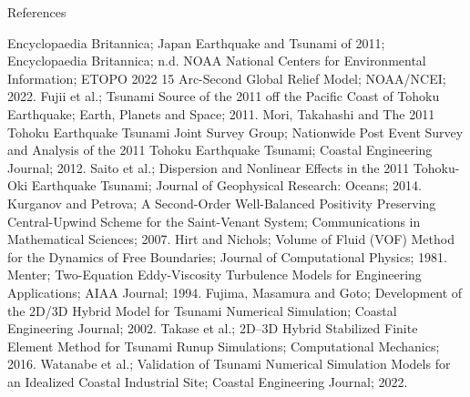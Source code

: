 \documentclass{article}
\newcommand{\PosterReferenceText}[1]{{\fontsize{11.8}{14.2}\selectfont\color{PosterMuted}\RaggedRight #1\par}}
\begin{document}
\vfill
\begin{PosterBox}{References}
  \PosterReferenceText{%
  Encyclopaedia Britannica; Japan Earthquake and Tsunami of 2011; Encyclopaedia Britannica; n.d. \quad
  NOAA National Centers for Environmental Information; ETOPO 2022 15 Arc-Second Global Relief Model; NOAA/NCEI; 2022. \quad
  Fujii et al.; Tsunami Source of the 2011 off the Pacific Coast of Tohoku Earthquake; Earth, Planets and Space; 2011. \quad
  Mori, Takahashi and The 2011 Tohoku Earthquake Tsunami Joint Survey Group; Nationwide Post Event Survey and Analysis of the 2011 Tohoku Earthquake Tsunami; Coastal Engineering Journal; 2012. \quad
  Saito et al.; Dispersion and Nonlinear Effects in the 2011 Tohoku-Oki Earthquake Tsunami; Journal of Geophysical Research: Oceans; 2014. \quad
  Kurganov and Petrova; A Second-Order Well-Balanced Positivity Preserving Central-Upwind Scheme for the Saint-Venant System; Communications in Mathematical Sciences; 2007. \quad
  Hirt and Nichols; Volume of Fluid (VOF) Method for the Dynamics of Free Boundaries; Journal of Computational Physics; 1981. \quad
  Menter; Two-Equation Eddy-Viscosity Turbulence Models for Engineering Applications; AIAA Journal; 1994. \quad
  Fujima, Masamura and Goto; Development of the 2D/3D Hybrid Model for Tsunami Numerical Simulation; Coastal Engineering Journal; 2002. \quad
  Takase et al.; 2D--3D Hybrid Stabilized Finite Element Method for Tsunami Runup Simulations; Computational Mechanics; 2016. \quad
  Watanabe et al.; Validation of Tsunami Numerical Simulation Models for an Idealized Coastal Industrial Site; Coastal Engineering Journal; 2022.}
\end{PosterBox}
\end{document}
